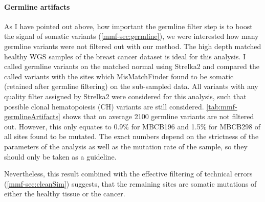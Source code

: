 
\paragraph{Germline artifacts}
\label{mmf-sec:germlineArtifacts}
As I have pointed out above, how important the germline filter step is to boost the signal of somatic variants (\autoref{mmf-sec:germline}), we were interested how many germline variants were not filtered out with our method. The high depth matched healthy WGS samples of the breast cancer dataset is ideal for this analysis. I called germline variants on the matched normal using Strelka2 and compared the called variants with the sites which MisMatchFinder found to be somatic (retained after germline filtering) on the sub-sampled data.  All variants with any quality filter assigned by Strelka2 were considered for this analysis, such that possible clonal hematopoiesis (CH) variants are still considered. \autoref{tab:mmf-germlineArtifacts} shows that on average 2100 germline variants are not filtered out. However, this only equates to 0.9\% for MBCB196 and 1.5\% for MBCB298 of all sites found to be mutated. The exact numbers depend on the strictness of the parameters of the analysis as well as the mutation rate of the sample, so they should only be taken as a guideline.

Nevertheless, this result combined with the effective filtering of technical errors (\autoref{mmf-sec:cleanSim}) suggests, that the remaining sites are somatic mutations of either the healthy tissue or the cancer.

